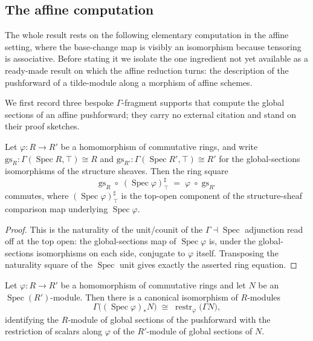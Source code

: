 \subsection{The affine computation}

The whole result rests on the following elementary computation in the affine
setting, where the base-change map is visibly an isomorphism because tensoring is
associative. Before stating it we isolate the one ingredient not yet available as
a ready-made result on which the affine reduction turns: the description of the
pushforward of a tilde-module along a morphism of affine schemes.

We first record three bespoke \(\Gamma\)-fragment supports that compute the global
sections of an affine pushforward; they carry no external citation and stand on
their proof sketches.

\begin{lemma}\label{mk-lem:globalSectionsIso_hom_comp_specMap_appTop}
  \leanok

  Let \(\varphi : R \to R'\) be a homomorphism of commutative rings, and write
  \(\mathrm{gs}_R : \Gamma(\operatorname{Spec} R, \top) \cong R\) and
  \(\mathrm{gs}_{R'} : \Gamma(\operatorname{Spec} R', \top) \cong R'\) for the
  global-sections isomorphisms of the structure sheaves. Then the ring square
  \[
    \mathrm{gs}_R \;\circ\; (\operatorname{Spec}\varphi)^{\sharp}_{\top}
    \;=\; \varphi \;\circ\; \mathrm{gs}_{R'}
  \]
  commutes, where \((\operatorname{Spec}\varphi)^{\sharp}_{\top}\) is the
  top-open component of the structure-sheaf comparison map underlying
  \(\operatorname{Spec}\varphi\).
\end{lemma}

\begin{proof}
  \leanok


This is the naturality of the unit/counit of the
  \(\Gamma \dashv \operatorname{Spec}\) adjunction read off at the top open: the
  global-sections map of \(\operatorname{Spec}\varphi\) is, under the
  global-sections isomorphisms on each side, conjugate to \(\varphi\) itself.
  Transposing the naturality square of the \(\operatorname{Spec}\) unit gives
  exactly the asserted ring equation.
\end{proof}

\begin{lemma}\label{mk-lem:gammaPushforwardIso}
  \leanok

  Let \(\varphi : R \to R'\) be a homomorphism of commutative rings and let
  \(N\) be an \(\operatorname{Spec}(R')\)-module. Then there is a canonical
  isomorphism of \(R\)-modules
  \[
    \Gamma\bigl((\operatorname{Spec}\varphi)_* N\bigr)
    \;\cong\;
    \operatorname{restr}_\varphi\bigl(\Gamma N\bigr),
  \]
  identifying the \(R\)-module of global sections of the pushforward with the
  restriction of scalars along \(\varphi\) of the \(R'\)-module of global sections
  of \(N\).
\end{lemma}

